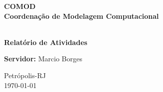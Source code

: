 \documentclass[12pt,a4paper,english]{article}
\begin{document}
\AddToShipoutPicture*{\BackgroundPic}
\begin{titlepage}
%
%
\hspace{-11.75mm}
\noindent \begin{minipage}[t][1.5cm][l]{2.2cm} 
\scriptsize
\centering
\par\vspace{-0mm}
\par\vspace{-0mm} 
\par\vspace{-0mm}
\par
\end{minipage}
%
\vspace{-20mm}
\begin{center}
 \hspace{25mm}\textbf{\large\sf \textbf{COMOD}\\\hspace{25mm}Coordena\c c\~ao de Modelagem Computacional}
\end{center}
%
\begin{center}
{\vspace{30mm}\textbf{\Large \sf }\\
\vspace{30mm}
\hspace{25mm}\textbf{\Huge \textsf{ Relatório de Atividades}}}
\end{center}
%
\begin{flushright}
\vspace{50mm}
  \textbf{Servidor:} Marcio Borges
\vspace{50mm}
\end{flushright}
%
	\begin{center}
	{Petrópolis-RJ\\ \today }
	\end{center}
%
\clearpage
\small
{}
\end{titlepage}
\end{document}
